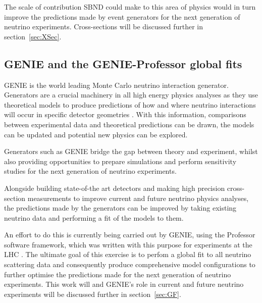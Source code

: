     The scale of contribution SBND could make to this area of physics would in turn improve the predictions made by event generators for the next generation of neutrino experiments. Cross-sections will be discussed further in section~\ref{sec:XSec}.
    
\subsection{GENIE and the GENIE-Professor global fits}

GENIE is the world leading Monte Carlo neutrino interaction generator. Generators are a crucial machinery in all high energy physics analyses as they use theoretical models to produce predictions of how and where neutrino interactions will occur in specific detector geometries \cite{genie}. With this information, comparisons between experimental data and theoretical predictions can be drawn, the models can be updated and potential new physics can be explored.

    Generators such as GENIE bridge the gap between theory and experiment, whilst also providing opportunities to prepare simulations and perform sensitivity studies for the next generation of neutrino experiments.

    Alongside building state-of-the art detectors and making high precision cross-section measurements to improve current and future neutrino physics analyses, the predictions made by the generators can be improved by taking existing neutrino data and performing a fit of the models to them. 

    An effort to do this is currently being carried out by GENIE, using the Professor software framework, which was written with this purpose for experiments at the LHC \cite{prof}. The ultimate goal of this exercise is to perfom a global fit to all neutrino scattering data and consequently produce comprehensive model configurations to further optimise the predictions made for the next generation of neutrino experiments. This work will and GENIE's role in current and future neutrino experiments will be discussed further in section~\ref{sec:GF}.

\clearpage
